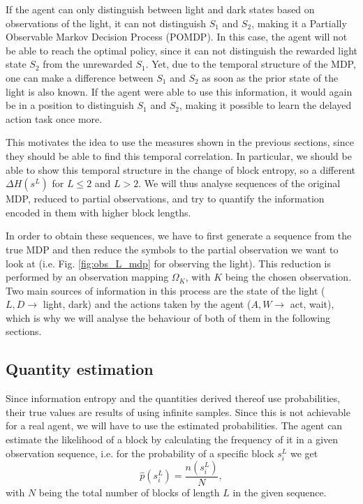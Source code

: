 \documentclass[12pt,a4paper]{article}
\begin{document}
If the agent can only distinguish between light and dark states based on observations of the light, it can not distinguish $S_1$ and $S_2$, making it a Partially Observable Markov Decision Process (POMDP).
In this case, the agent will not be able to reach the optimal policy, since it can not distinguish the rewarded light state $S_2$ from the unrewarded $S_1$.
Yet, due to the temporal structure of the MDP, one can make a difference between $S_1$ and $S_2$ as soon as the prior state of the light is also known.
If the agent were able to use this information, it would again be in a position to distinguish $S_1$ and $S_2$, making it possible to learn the delayed action task once more.

This motivates the idea to use the measures shown in the previous sections, since they should be able to find this temporal correlation.
In particular, we should be able to show this temporal structure in the change of block entropy, so a different $\Delta H(s^L)$ for $L \leq 2$ and $L>2$.
We will thus analyse sequences of the original MDP, reduced to partial observations, and try to quantify the information encoded in them with higher block lengths.

In order to obtain these sequences, we have to first generate a sequence from the true MDP and then reduce the symbols to the partial observation we want to look at (i.e. Fig. \ref{fig:obs_L_mdp} for observing the light).
This reduction is performed by an observation mapping $\Omega_K$, with $K$ being the chosen observation.
Two main sources of information in this process are the state of the light ($L,D \to$ light, dark) and the actions taken by the agent ($A,W \to$ act, wait), which is why we will analyse the behaviour of both of them in the following sections.

\subsection{Quantity estimation}
Since information entropy and the quantities derived thereof use probabilities, their true values are results of using infinite samples.
Since this is not achievable for a real agent, we will have to use the estimated probabilities.
The agent can estimate the likelihood of a block by calculating the frequency of it in a given observation sequence, i.e. for the probability of a specific block $s_i^L$ we get
\begin{equation}
    \label{eq:prob_estimator}
    \hat{p}(s_i^L) = \frac{n(s_i^L)}{N},
\end{equation}
with $N$ being the total number of blocks of length $L$ in the given sequence.
\end{document}
